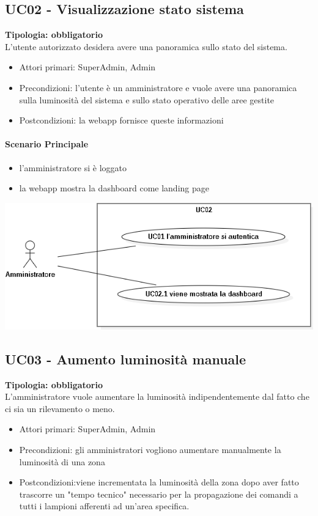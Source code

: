 \documentclass[12pt]{article}
\begin{document}
\subsection{UC02 - Visualizzazione stato sistema}
\textbf{Tipologia: obbligatorio} \\
L'utente autorizzato desidera avere una panoramica sullo stato del sistema.
\begin{itemize}
	\item Attori primari: SuperAdmin, Admin
	\item Precondizioni: l'utente è un amministratore e vuole avere una panoramica sulla luminosità del sistema e sullo stato operativo delle aree gestite
	\item Postcondizioni: la webapp fornisce queste informazioni
\end{itemize}
\paragraph{Scenario Principale}
\begin{itemize}
	\item l'amministratore si è loggato
	\item la webapp mostra la dashboard come landing page
\end{itemize}

\includegraphics[scale=0.5]{UC02.png}

\subsection{UC03 - Aumento luminosità manuale}
\textbf{Tipologia: obbligatorio} \\
L'amministratore vuole aumentare la luminosità indipendentemente dal fatto che ci sia un rilevamento o meno.
\begin{itemize}
	\item Attori primari: SuperAdmin, Admin
	\item Precondizioni: gli amministratori vogliono aumentare manualmente la luminosità di una zona
	\item Postcondizioni:viene incrementata la luminosità della zona dopo aver fatto trascorre un "tempo tecnico" necessario per la propagazione dei comandi a tutti i lampioni afferenti ad un'area specifica.
\end{itemize}
\end{document}
